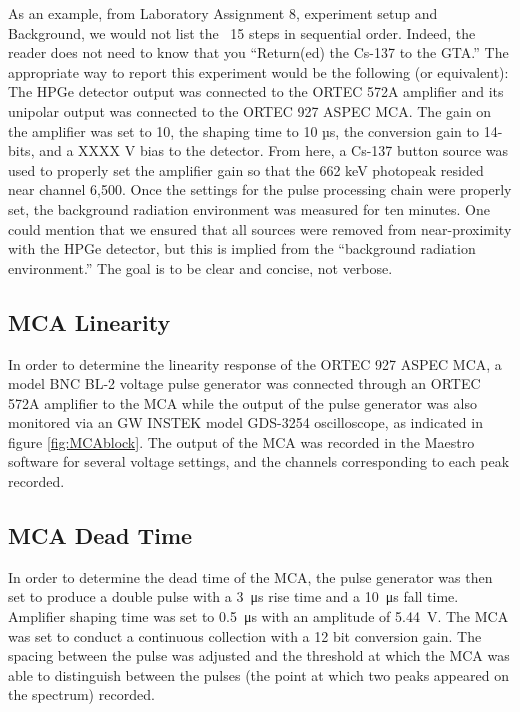 \documentclass[12pt]{article}
\begin{document}
As an example, from Laboratory Assignment 8, experiment setup and Background, we would not list the ~15 steps in sequential order. Indeed, the reader does not need to know that you “Return(ed) the Cs-137 to the GTA.” The appropriate way to report this experiment would be the following (or equivalent): The HPGe detector output was connected to the ORTEC 572A amplifier and its unipolar output was connected to the ORTEC 927 ASPEC MCA. The gain on the amplifier was set to 10, the shaping time to 10 µs, the conversion gain to 14-bits, and a XXXX V bias to the detector. From here, a Cs-137 button source was used to properly set the amplifier gain so that the 662 keV photopeak resided near channel 6,500. Once the settings for the pulse processing chain were properly set, the background radiation environment was measured for ten minutes. One could mention that we ensured that all sources were removed from near-proximity with the HPGe detector, but this is implied from the “background radiation environment.” The goal is to be clear and concise, not verbose. 

\subsection{MCA Linearity}
In order to determine the linearity response of the ORTEC 927 ASPEC MCA, a model BNC BL-2 voltage pulse generator was connected through an ORTEC 572A amplifier to the MCA while the output of the pulse generator was also monitored via an GW INSTEK model GDS-3254 oscilloscope, as indicated in figure \ref{fig:MCAblock}. The output of the MCA was recorded in the Maestro software for several voltage settings, and the channels corresponding to each peak recorded.

\subsection{MCA Dead Time}
In order to determine the dead time of the MCA, the pulse generator was then set to produce a double pulse with a \SI{3}{\micro\second} rise time and a \SI{10}{\micro\second} fall time. Amplifier shaping time was set to \SI{0.5}{\micro\second} with an amplitude of \SI{5.44}{\volt}. The MCA was set to conduct a continuous collection with a 12 bit conversion gain. The spacing between the pulse was adjusted and the threshold at which the MCA was able to distinguish between the pulses (the point at which two peaks appeared on the spectrum) recorded. 
\end{document}
